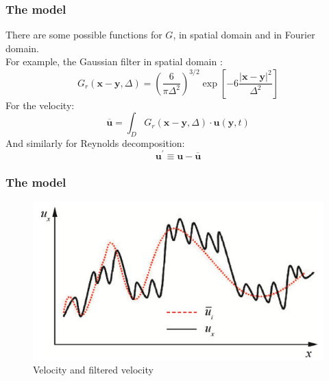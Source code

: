 \documentclass{beamer}
\begin{document}
\begin{frame}
\frametitle{The model}
There are some possible functions for $G$, in spatial domain and in Fourier domain.\\
For example, the Gaussian filter in spatial domain \cite{zouLARGEEDDYSIMULATION2006}:
\begin{equation}
  G_r(\mathbf{x} - \mathbf{y}, \Delta) = \left( \frac{6}{\pi \Delta^2} \right)^{3/2} 
  \exp \left[ -6 \frac{|\mathbf{x} - \mathbf{y}|^2}{\Delta^2} \right] 
\end{equation}
For the velocity:
\begin{equation}
  \overline{\mathbf{u}} =\int_D G_r(\mathbf{x} - \mathbf{y}, \Delta) \cdot \mathbf{u}(\mathbf{y},t)
\end{equation}
And similarly for Reynolds decomposition:
\begin{equation}
  \mathbf{u}^{'} \equiv \mathbf{u}-\overline{\mathbf{u}} 
\end{equation}

\end{frame}
\begin{frame}
  \frametitle{The model}
  \begin{figure}[ht] %
    \centering
    \includegraphics[width=1\textwidth]{filtered_velocity.png} %
    \caption{Velocity and filtered velocity \cite{zhiyinLargeeddySimulationPresent2015}} %
    \label{filtered_velocity} %
  \end{figure}
\end{frame}
\end{document}
